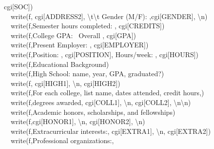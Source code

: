 {{cgi[{\textquotedbl}SOC{\textquotedbl}]) \\
\ \ write(f, cgi[{\textquotedbl}ADDRESS2{\textquotedbl}],
{\textquotedbl} {\textbackslash}t{\textbackslash}t Gender (M/F):
{\textquotedbl},cgi[{\textquotedbl}GENDER{\textquotedbl}],
{\textquotedbl}{\textbackslash}n{\textquotedbl}) \\
\ \ write(f,{\textquotedbl}Semester hours completed: {\textquotedbl},
cgi[{\textquotedbl}CREDITS{\textquotedbl}]) \\
\ \ write(f,{\textquotedbl}College GPA: \ Overall {\textquotedbl},
cgi[{\textquotedbl}GPA{\textquotedbl}]) \\
\ \ write(f,{\textquotedbl}Present Employer: {\textquotedbl},
cgi[{\textquotedbl}EMPLOYER{\textquotedbl}]) \\
\ \ write(f,{\textquotedbl}Position: {\textquotedbl},
cgi[{\textquotedbl}POSITION{\textquotedbl}], {\textquotedbl}
Hours/week: {\textquotedbl}, cgi[{\textquotedbl}HOURS{\textquotedbl}]) \\
\ \ write(f,{\textquotedbl}Educational Background{\textquotedbl}) \\
\ \ write(f,{\textquotedbl}High School: name, year, GPA,
		graduated?{\textquotedbl}) \\
\ \ write(f, cgi[{\textquotedbl}HIGH1{\textquotedbl}],
{\textquotedbl}{\textbackslash}n{\textquotedbl},
cgi[{\textquotedbl}HIGH2{\textquotedbl}]) \\
\ \ write(f,{\textquotedbl}For each college, list name, dates attended,
credit hours,{\textquotedbl}) \\
\ \ write(f,{\textquotedbl}degrees awarded{\textquotedbl}, cgi[{\textquotedbl}COLL1{\textquotedbl}],
{\textquotedbl}{\textbackslash}n{\textquotedbl},
cgi[{\textquotedbl}COLL2{\textquotedbl}],
{\textquotedbl}{\textbackslash}n{\textbackslash}n{\textquotedbl}) \\
\ \ write(f,{\textquotedbl}Academic honors, scholarships, and
fellowships{\textquotedbl}) \\
\ \ write(f,cgi[{\textquotedbl}HONOR1{\textquotedbl}],
{\textquotedbl}{\textbackslash}n{\textquotedbl},
cgi[{\textquotedbl}HONOR2{\textquotedbl}],
{\textquotedbl}{\textbackslash}n{\textquotedbl}) \\
\ \ write(f,{\textquotedbl}Extracurricular interests:{\textquotedbl}, cgi[{\textquotedbl}EXTRA1{\textquotedbl}],
{\textquotedbl}{\textbackslash}n{\textquotedbl},
cgi[{\textquotedbl}EXTRA2{\textquotedbl}]) \\
\ \ write(f,{\textquotedbl}Professional organizations:{\textquotedbl},
}}
